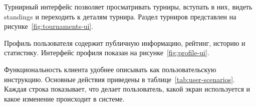 
Турнирный интерфейс позволяет просматривать турниры, вступать в них, видеть standings и переходить к деталям турнира. Раздел турниров представлен на рисунке~\ref{fig:tournaments-ui}.


Профиль пользователя содержит публичную информацию, рейтинг, историю и статистику. Интерфейс профиля показан на рисунке~\ref{fig:profile-ui}.




Функциональность клиента удобнее описывать как пользовательскую инструкцию. Основные действия приведены в таблице~\ref{tab:user-scenarios}. Каждая строка показывает, что делает пользователь, какой экран используется и какое изменение происходит в системе.


